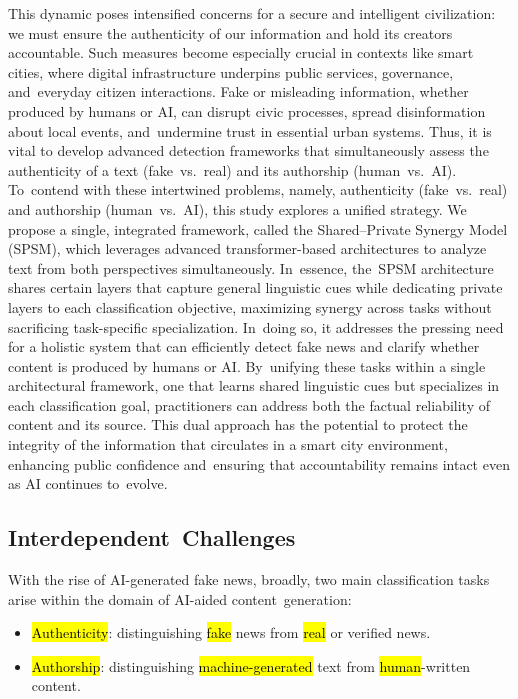 \documentclass[electronics,article,accept,pdftex,moreauthors,electronics]{Definitions/mdpi}
\begin{document}
This dynamic poses intensified concerns for a secure and intelligent civilization: we must ensure the authenticity of our information and hold its creators accountable. Such measures become especially crucial in contexts like smart cities, where digital infrastructure underpins public services, governance, and~everyday citizen interactions. Fake or misleading information, whether produced by humans or AI, can disrupt civic processes, spread disinformation about local events, and~undermine trust in essential urban systems. Thus, it is vital to develop advanced detection frameworks that simultaneously assess the authenticity of a text (fake~vs.~real) and its authorship (human~vs.~AI). To~contend with these intertwined problems, namely, authenticity (fake~vs.~real) and authorship (human~vs.~AI), this study explores a unified strategy. We propose a single, integrated framework, called the Shared--Private Synergy Model (SPSM), which leverages advanced transformer-based architectures to analyze text from both perspectives simultaneously. In~essence, the~SPSM architecture shares certain layers that capture general linguistic cues while dedicating private layers to each classification objective, maximizing synergy across tasks without sacrificing task-specific specialization. In~doing so, it addresses the pressing need for a holistic system that can efficiently detect fake news and clarify whether content is produced by humans or AI. By~unifying these tasks within a single architectural framework, one that learns shared linguistic cues but specializes in each classification goal, practitioners can address both the factual reliability of content and its source. This dual approach has the potential to protect the integrity of the information that circulates in a smart city environment, enhancing public confidence and~ensuring that accountability remains intact even as AI continues to~evolve.

\subsection{Interdependent~Challenges}

With the rise of AI-generated fake news, broadly, two main classification tasks arise within the domain of AI-aided content~generation:
\begin{itemize}
    \item {\hl{Authenticity}}: distinguishing {\hl{fake}} news from {\hl{real}} or verified news.
    \item {\hl{Authorship}}: distinguishing {\hl{machine-generated}} text from {\hl{human}}-written content.
\end{itemize}
\end{document}
